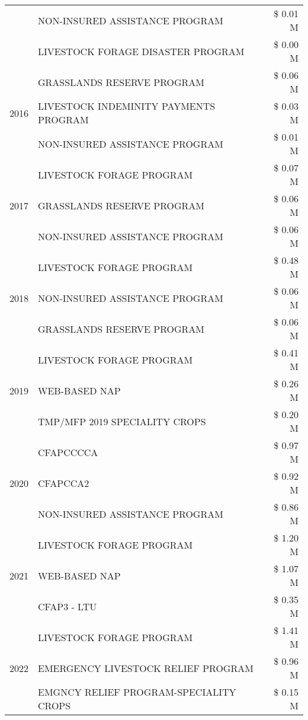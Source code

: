 \begin{tabular}{llr}
 & NON-INSURED ASSISTANCE PROGRAM & \$ 0.01 M \\
 & LIVESTOCK FORAGE DISASTER PROGRAM & \$ 0.00 M \\
\cline{1-3}
\multirow[t]{3}{*}{2016} & GRASSLANDS RESERVE PROGRAM & \$ 0.06 M \\
 & LIVESTOCK INDEMINITY PAYMENTS PROGRAM & \$ 0.03 M \\
 & NON-INSURED ASSISTANCE PROGRAM & \$ 0.01 M \\
\cline{1-3}
\multirow[t]{3}{*}{2017} & LIVESTOCK FORAGE PROGRAM & \$ 0.07 M \\
 & GRASSLANDS RESERVE PROGRAM & \$ 0.06 M \\
 & NON-INSURED ASSISTANCE PROGRAM & \$ 0.06 M \\
\cline{1-3}
\multirow[t]{3}{*}{2018} & LIVESTOCK FORAGE PROGRAM & \$ 0.48 M \\
 & NON-INSURED ASSISTANCE PROGRAM & \$ 0.06 M \\
 & GRASSLANDS RESERVE PROGRAM & \$ 0.06 M \\
\cline{1-3}
\multirow[t]{3}{*}{2019} & LIVESTOCK FORAGE PROGRAM & \$ 0.41 M \\
 & WEB-BASED NAP & \$ 0.26 M \\
 & TMP/MFP 2019 SPECIALITY CROPS & \$ 0.20 M \\
\cline{1-3}
\multirow[t]{3}{*}{2020} & CFAPCCCCA & \$ 0.97 M \\
 & CFAPCCA2 & \$ 0.92 M \\
 & NON-INSURED ASSISTANCE PROGRAM & \$ 0.86 M \\
\cline{1-3}
\multirow[t]{3}{*}{2021} & LIVESTOCK FORAGE PROGRAM & \$ 1.20 M \\
 & WEB-BASED NAP & \$ 1.07 M \\
 & CFAP3 - LTU & \$ 0.35 M \\
\cline{1-3}
\multirow[t]{3}{*}{2022} & LIVESTOCK FORAGE PROGRAM & \$ 1.41 M \\
 & EMERGENCY LIVESTOCK RELIEF PROGRAM & \$ 0.96 M \\
 & EMGNCY RELIEF PROGRAM-SPECIALITY CROPS & \$ 0.15 M \\
\cline{1-3}
\bottomrule
\end{tabular}
